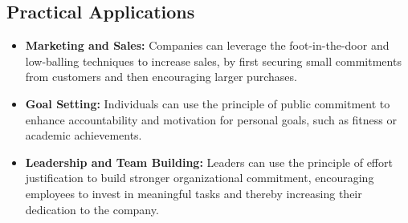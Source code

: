 \subsection*{Practical Applications}
\begin{itemize}
    \item \textbf{Marketing and Sales:} Companies can leverage the foot-in-the-door and low-balling techniques to increase sales, by first securing small commitments from customers and then encouraging larger purchases.
    \item \textbf{Goal Setting:} Individuals can use the principle of public commitment to enhance accountability and motivation for personal goals, such as fitness or academic achievements.
    \item \textbf{Leadership and Team Building:} Leaders can use the principle of effort justification to build stronger organizational commitment, encouraging employees to invest in meaningful tasks and thereby increasing their dedication to the company.
\end{itemize}
